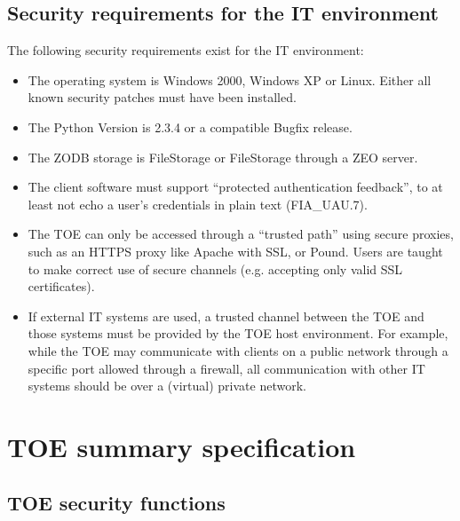 \documentclass[12pt,english]{scrbook}
\begin{document}



\section{Security requirements for the IT environment}

The following security requirements exist for the IT environment:

\begin{itemize}

  \item The operating system is Windows 2000, Windows XP or Linux. Either all
      known security patches must have been installed.

  \item The Python Version is 2.3.4 or a compatible Bugfix release.

  \item The ZODB storage is FileStorage or FileStorage through a ZEO server.

  \item The client software must support ``protected authentication feedback'',
  to at least not echo a user's credentials in plain text (FIA{\_}UAU.7).

  \item The TOE can only be accessed through a ``trusted path'' using secure
      proxies, such as an HTTPS proxy like Apache with SSL, or Pound. Users are
      taught to make correct use of secure channels (e.g. accepting only valid
      SSL certificates).

  \item If external IT systems are used, a trusted channel between the TOE and
      those systems must be provided by the TOE host environment.  For example,
      while the TOE may communicate with clients on a public network through a
      specific port allowed through a firewall, all communication with other IT
      systems should be over a (virtual) private network.

\end{itemize}

\chapter{TOE summary specification}


\section{TOE security functions}  \label{toe-sec-funcs}
\end{document}
